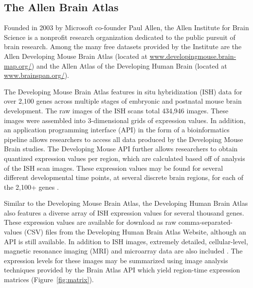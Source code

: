 \documentclass[12pt,oneside,onecolumn,a4paper]{article}
\begin{document}
\subsection{The Allen Brain Atlas}
Founded in 2003 by Microsoft co-founder Paul Allen, the Allen Institute for Brain Science is a nonprofit research organization dedicated to the public pursuit of brain research. Among the many free datasets provided by the Institute are the Allen Developing Mouse Brain Atlas (located at \href{http://www.developingmouse.brain-map.org/}{www.developingmouse.brain-map.org/}) and the Allen Atlas of the Developing Human Brain (located at \href{http://www.brainspan.org/}{www.brainspan.org/}).

The Developing Mouse Brain Atlas features in situ hybridization (ISH) data for over 2,100 genes across multiple stages of embryonic and postnatal mouse brain development. The raw images of the ISH scans total 434,946 images. These images were assembled into 3-dimensional grids of expression values.  In addition, an application programming interface (API) in the form of a bioinformatics pipeline allows researchers to access all data produced by the Developing Mouse Brain studies. The Developing Mouse API further allows researchers to obtain quantized expression values per region, which are calculated based off of analysis of the ISH scan images. These expression values may be found for several different developmental time points, at several discrete brain regions, for each of the 2,100+ genes \citep{Thompson_2014}.

Similar to the Developing Mouse Brain Atlas, the Developing Human Brain Atlas also features a diverse array of ISH expression values for several thousand genes. These expression values are available for download as raw comma-separated-values (CSV) files from the Developing Human Brain Atlas Website, although an API is still available. In addition to ISH images, extremely detailed, cellular-level, magnetic resonance imaging (MRI) and microarray data are also included \citep{24695229}. The expression levels for these images may be summarized using image analysis techniques provided by the Brain Atlas API which yield region-time expression matrices (Figure~\ref{fig:matrix}).
\end{document}
